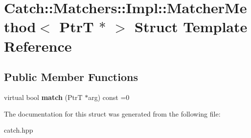 \hypertarget{structCatch_1_1Matchers_1_1Impl_1_1MatcherMethod_3_01PtrT_01_5_01_4}{}\section{Catch\+:\+:Matchers\+:\+:Impl\+:\+:Matcher\+Method$<$ PtrT $\ast$ $>$ Struct Template Reference}
\label{structCatch_1_1Matchers_1_1Impl_1_1MatcherMethod_3_01PtrT_01_5_01_4}
\subsection*{Public Member Functions}
\begin{DoxyCompactItemize}
\item 
virtual bool {\bfseries match} (PtrT $\ast$arg) const =0\hypertarget{structCatch_1_1Matchers_1_1Impl_1_1MatcherMethod_3_01PtrT_01_5_01_4_a5fdd64f9509724f32ffc73cb320181d1}{}\label{structCatch_1_1Matchers_1_1Impl_1_1MatcherMethod_3_01PtrT_01_5_01_4_a5fdd64f9509724f32ffc73cb320181d1}

\end{DoxyCompactItemize}


The documentation for this struct was generated from the following file\+:\begin{DoxyCompactItemize}
\item 
catch.\+hpp\end{DoxyCompactItemize}
